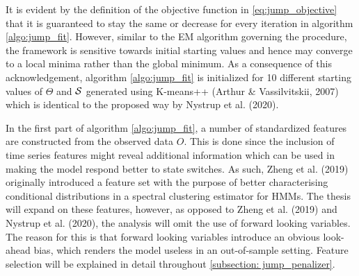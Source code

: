 It is evident by the definition of the objective function in \cref{eq:jump_objective} that it is guaranteed to stay the same or decrease for every iteration in algorithm \ref{algo:jump_fit}. However, similar to the EM algorithm governing the \mle procedure, the \jump framework is sensitive towards initial starting values and hence may converge to a local minima rather than the global minimum. As a consequence of this acknowledgement, algorithm \ref{algo:jump_fit} is initialized for 10 different starting values of $\Theta$ and $\S$ generated using K-means++ (Arthur \& Vassilvitskii, 2007) which is identical to the proposed way by Nystrup et al. (2020).

In the first part of algorithm \ref{algo:jump_fit}, a number of standardized features are constructed from the observed data $O$. This is done since the inclusion of time series features might reveal additional information which can be used in making the model respond better to state switches. As such, Zheng et al. (2019) originally introduced a feature set with the purpose of better characterising conditional distributions in a spectral clustering estimator for HMMs. The thesis will expand on these features, however, as opposed to Zheng et al. (2019) and Nystrup et al. (2020), the analysis will omit the use of forward looking variables. The reason for this is that forward looking variables introduce an obvious look-ahead bias, which renders the model useless in an out-of-sample setting. Feature selection will be explained in detail throughout \cref{subsection: jump_penalizer}.

